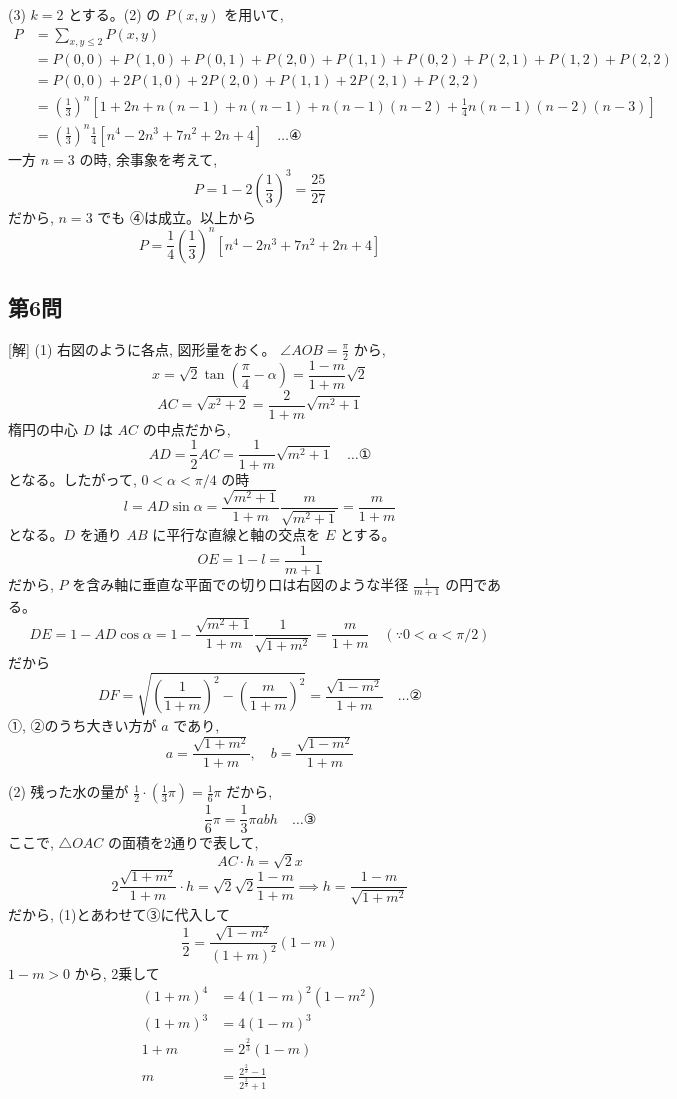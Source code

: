 \documentclass[../main.tex]{subfiles}
\begin{document}
(3) $k = 2$ とする。(2) の $P(x, y)$ を用いて,
\begin{align*}
P &= \sum_{x, y \le 2} P(x, y) \\
&= P(0,0) + P(1,0) + P(0,1) + P(2,0) + P(1,1) + P(0,2) + P(2,1) + P(1,2) + P(2,2) \\
&= P(0,0) + 2 P(1,0) + 2 P(2,0) + P(1,1) + 2 P(2,1) + P(2,2) \\
&= \left(\frac{1}{3}\right)^n \left[ 1 + 2n + n(n-1) + n(n-1) + n(n-1)(n-2) + \frac{1}{4}n(n-1)(n-2)(n-3) \right] \\
&= \left(\frac{1}{3}\right)^n \frac{1}{4} \left[ n^4 - 2n^3 + 7n^2 + 2n + 4 \right] \quad \dots \text{④}
\end{align*}
一方 $n=3$ の時, 余事象を考えて,
\[
P = 1 - 2\left(\frac{1}{3}\right)^3 = \frac{25}{27}
\]
だから, $n=3$ でも ④は成立。以上から
\[
P = \frac{1}{4} \left(\frac{1}{3}\right)^n \left[ n^4 - 2n^3 + 7n^2 + 2n + 4 \right]
\]


\subsection*{第6問}

[解] (1) 右図のように各点, 図形量をおく。
$\angle AOB = \frac{\pi}{2}$ から,
\[
x = \sqrt{2}\tan\left(\frac{\pi}{4} - \alpha\right) = \frac{1-m}{1+m}\sqrt{2}
\]
\[
AC = \sqrt{x^2+2} = \frac{2}{1+m}\sqrt{m^2+1}
\]
楕円の中心 $D$ は $AC$ の中点だから,
\[
AD = \frac{1}{2}AC = \frac{1}{1+m}\sqrt{m^2+1} \quad \dots \text{①}
\]
となる。したがって, $0 < \alpha < \pi/4$ の時
\[
l = AD \sin\alpha = \frac{\sqrt{m^2+1}}{1+m} \frac{m}{\sqrt{m^2+1}} = \frac{m}{1+m}
\]
となる。$D$ を通り $AB$ に平行な直線と軸の交点を $E$ とする。
\[
OE = 1 - l = \frac{1}{m+1}
\]
だから, $P$ を含み軸に垂直な平面での切り口は右図のような半径 $\frac{1}{m+1}$ の円である。
\[
DE = 1 - AD \cos\alpha = 1 - \frac{\sqrt{m^2+1}}{1+m}\frac{1}{\sqrt{1+m^2}} = \frac{m}{1+m} \quad (\because 0 < \alpha < \pi/2)
\]
だから
\[
DF = \sqrt{\left(\frac{1}{1+m}\right)^2 - \left(\frac{m}{1+m}\right)^2} = \frac{\sqrt{1-m^2}}{1+m} \quad \dots \text{②}
\]
①, ②のうち大きい方が $a$ であり,
\[
a = \frac{\sqrt{1+m^2}}{1+m}, \quad b = \frac{\sqrt{1-m^2}}{1+m}
\]

(2) 残った水の量が $\frac{1}{2} \cdot \left(\frac{1}{3}\pi\right) = \frac{1}{6}\pi$ だから,
\[
\frac{1}{6}\pi = \frac{1}{3}\pi a b h \quad \dots \text{③}
\]
ここで, $\triangle OAC$ の面積を2通りで表して,
\[
AC \cdot h = \sqrt{2} x
\]
\[
2\frac{\sqrt{1+m^2}}{1+m} \cdot h = \sqrt{2}\sqrt{2}\frac{1-m}{1+m} \implies h = \frac{1-m}{\sqrt{1+m^2}}
\]
だから, (1)とあわせて③に代入して
\[
\frac{1}{2} = \frac{\sqrt{1-m^2}}{(1+m)^2} (1-m)
\]
$1-m > 0$ から, 2乗して
\begin{align*}
(1+m)^4 &= 4(1-m)^2(1-m^2) \\
(1+m)^3 &= 4(1-m)^3 \\
1+m &= 2^{\frac{2}{3}}(1-m) \\
m &= \frac{2^{\frac{2}{3}}-1}{2^{\frac{2}{3}}+1}
\end{align*}
\end{document}
